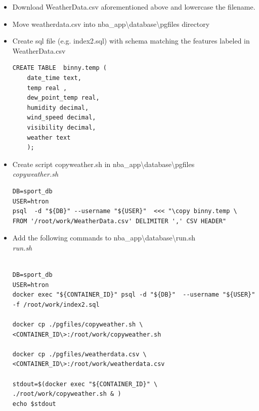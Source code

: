 \documentclass[a4paper,11pt]{article}
\newcommand{\newpagex}{
    \newpage
    \vspace*{-7\baselineskip} %
}
\begin{document}
    \begin{itemize}
        \item Download WeatherData.csv aforementioned above and lowercase the filename.
        \item Move weatherdata.csv into nba\_app\textbackslash{}database\textbackslash{}pgfiles directory
        \item Create sql file (e.g. index2.sql) with schema matching the features labeled in WeatherData.csv
    
        \begin{verbatim}
CREATE TABLE  binny.temp (
    date_time text,
    temp real , 
    dew_point_temp real,
    humidity decimal, 
    wind_speed decimal,
    visibility decimal,
    weather text
    );
    \end{verbatim}
        \item Create script copyweather.sh in nba\_app\textbackslash{}database\textbackslash{}pgfiles \\ \smallskip 
        \textit{copyweather.sh}
        \begin{verbatim}
DB=sport_db
USER=htron
psql  -d "${DB}" --username "${USER}"  <<< "\copy binny.temp \
FROM '/root/work/WeatherData.csv' DELIMITER ',' CSV HEADER"
        \end{verbatim}

        \item Add the following commands to nba\_app\textbackslash{}database\textbackslash{}run.sh \\ \smallskip 
        \textit{run.sh}

        \begin{verbatim} 

DB=sport_db
USER=htron
docker exec "${CONTAINER_ID}" psql -d "${DB}"  --username "${USER}" -f /root/work/index2.sql

docker cp ./pgfiles/copyweather.sh \
<CONTAINER_ID\>:/root/work/copyweather.sh

docker cp ./pgfiles/weatherdata.csv \ 
<CONTAINER_ID\>:/root/work/weatherdata.csv

stdout=$(docker exec "${CONTAINER_ID}" \
./root/work/copyweather.sh & ) 
echo $stdout
        \end{verbatim} 
    \end{itemize}


    \newpagex
    \noindent 
\end{document}
